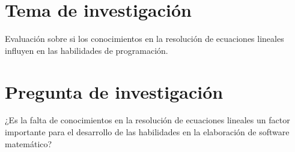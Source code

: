 \documentclass[12pt] {report}
\begin{document}
\section{Tema de investigación}
Evaluación sobre si los conocimientos en la resolución de ecuaciones lineales influyen en las habilidades de programación.\\ 
\section{Pregunta de investigación}
¿Es la falta de conocimientos en la resolución de ecuaciones lineales un factor importante para el desarrollo de las habilidades en la elaboración de software matemático? \\ 
\\ 
 
\end{document}
